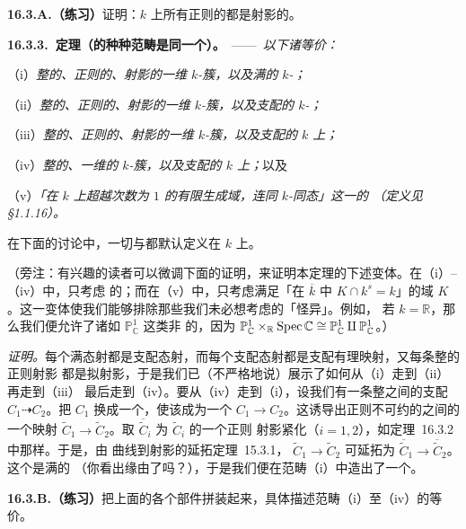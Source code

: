 \textbf{16.3.A.（练习）}\quad 证明：$k$ 上所有正则的\trProper\trCurve{}都是射影的。

\textbf{16.3.3.\ 定理（\trCurve{}的种种范畴是同一个）。}\ ——\ \emph{以下诸\trCategory{}等价：}

（i）\emph{整的、正则的、射影的一维 $k$-簇，以及满的 $k$-\trMorphism；}

（ii）\emph{整的、正则的、射影的一维 $k$-簇，以及支配的 $k$-\trMorphism；}

（iii）\emph{整的、正则的、射影的一维 $k$-簇，以及支配的 $k$ 上\trRationalMap；}

（iv）\emph{整的、一维的 $k$-簇，以及支配的 $k$ 上\trRationalMap；}以及

（v）\emph{「在 $k$ 上超越次数为 $1$ 的有限生成域，连同 $k$-同态」这一\trCategory{}的%
\trOppositeCategory（定义见 \S1.1.16）。}

在下面的讨论中，一切\trMorphism{}与\trMap{}都默认定义在 $k$ 上。

（旁注：有兴趣的读者可以微调下面的证明，来证明本定理的下述变体。在（i）--（iv）中，只考虑%
\trGeometricallyIrreducible{}的\trCurve；而在（v）中，只考虑满足「在 $\overline{k}$ 中
$K\cap k^s=k$」的域 $K$。这一变体使我们能够排除那些我们未必想考虑的「怪异」\trCurve。例如，
若 $k=\mathbb{R}$，那么我们便允许了诸如 $\mathbb{P}^1_{\mathbb{C}}$ 这类非%
\trGeometricallyIrreducible{}的\trCurve，因为
$\mathbb{P}^1_{\mathbb{C}}\times_{\mathbb{R}}\operatorname{Spec}\mathbb{C}\cong
\mathbb{P}^1_{\mathbb{C}}\amalg\mathbb{P}^1_{\mathbb{C}}$。）

\emph{证明。}\quad 每个满态射都是支配态射，而每个支配态射都是支配有理映射，又每条整的正则射影%
\trCurve{}都是拟射影\trCurve，于是我们已（不严格地说）展示了如何从（i）走到（ii）再走到（iii）
最后走到（iv）。要从（iv）走到（i），设我们有一条整\trCurve{}之间的支配\trRationalMap{}
$C_1\dashrightarrow C_2$。把 $C_1$ 换成一个\trDense\trOpenSet，使该\trRationalMap{}成为一个%
\trMorphism{} $C_1\to C_2$。这诱导出正则不可约\trCurve{}的\trNormalization{}之间的一个映射
$\widetilde{C}_1\to\widetilde{C}_2$。取 $\overline{\widetilde{C}}_i$ 为 $\widetilde{C}_i$ 的一个正则
射影紧化（$i=1,2$），如\mbox{定理~16.3.2} 中那样。于是，由
\mbox{曲线到射影的延拓定理~15.3.1}，\trMorphism{} $\widetilde{C}_1\to\widetilde{C}_2$ 可延拓为%
\trMorphism{} $\overline{\widetilde{C}}_1\to\overline{\widetilde{C}}_2$。这个\trMorphism{}是满的
（你看出缘由了吗？），于是我们便在范畴（i）中造出了一个\trMorphism。

\textbf{16.3.B.（练习）}\quad 把上面的各个部件拼装起来，具体描述范畴（i）至（iv）的等价。

